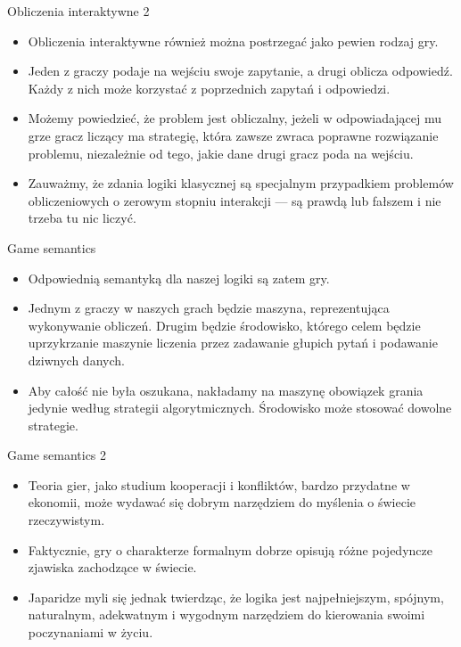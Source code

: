 \documentclass{beamer}
\begin{document}
\begin{frame}{Obliczenia interaktywne 2}
\begin{itemize}
	\item Obliczenia interaktywne również można postrzegać jako pewien rodzaj gry.
	\item Jeden z graczy podaje na wejściu swoje zapytanie, a drugi oblicza odpowiedź. Każdy z nich może korzystać z poprzednich zapytań i odpowiedzi.
	\item Możemy powiedzieć, że problem jest obliczalny, jeżeli w odpowiadającej mu grze gracz liczący ma strategię, która zawsze zwraca poprawne rozwiązanie problemu, niezależnie od tego, jakie dane drugi gracz poda na wejściu.
	\item Zauważmy, że zdania logiki klasycznej są specjalnym przypadkiem problemów obliczeniowych o zerowym stopniu interakcji — są prawdą lub fałszem i nie trzeba tu nic liczyć.
\end{itemize}
\end{frame}

\begin{frame}{Game semantics}
\begin{itemize}
	\item Odpowiednią semantyką dla naszej logiki są zatem gry.
	\item Jednym z graczy w naszych grach będzie maszyna, reprezentująca wykonywanie obliczeń. Drugim będzie środowisko, którego celem będzie uprzykrzanie maszynie liczenia przez zadawanie głupich pytań i podawanie dziwnych danych.
	\item Aby całość nie była oszukana, nakładamy na maszynę obowiązek grania jedynie według strategii algorytmicznych. Środowisko może stosować dowolne strategie.
\end{itemize}
\end{frame}

\begin{frame}{Game semantics 2}
\begin{itemize}
	\item Teoria gier, jako studium kooperacji i konfliktów, bardzo przydatne w ekonomii, może wydawać się dobrym narzędziem do myślenia o świecie rzeczywistym.
	\item Faktycznie, gry o charakterze formalnym dobrze opisują różne pojedyncze zjawiska zachodzące w świecie.
	\item Japaridze myli się jednak twierdząc, że logika jest najpełniejszym, spójnym, naturalnym, adekwatnym i wygodnym narzędziem do kierowania swoimi poczynaniami w życiu.
\end{itemize}
\end{frame}
\end{document}
